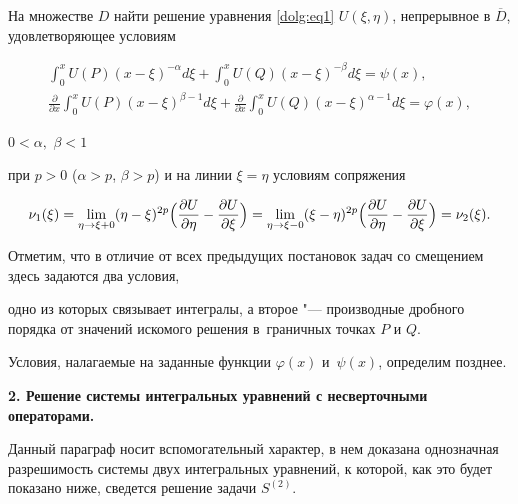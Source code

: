  На множестве $D$ найти решение уравнения \eqref{dolg:eq1} $U(\xi,\eta)$, непрерывное в $\overline{D}$, удовлетворяющее условиям

\begin{gather}\label{dolg:eq2}

\int _0^x U(P) (x-\xi)^{-\alpha} d\xi +  \int _0^x U(Q) (x-\xi)^{-\beta} d\xi = \psi(x),

\\



\label{dolg:eq3}

\frac{\partial}{\partial x}\int _0^x U(P) (x-\xi)^{\beta-1} d\xi +  \frac{\partial}{\partial x}\int _0^x U(Q) (x-\xi)^{\alpha-1} d\xi = \varphi(x),

\end{gather}

$0<\alpha,$ $\beta <1$ 

при $p>0$ ($\alpha>p$, $\beta>p$) и на линии $\xi=\eta$ условиям сопряжения

\begin{equation}\label{dolg:eq4}

\nu_1(\xi) = \lim_{\eta\to \xi+0} (\eta-\xi)^{2p} \Bigl(\frac{\partial U}{\partial \eta} - \frac{\partial U}{\partial \xi}\Bigr) = \lim_{\eta\to \xi-0} (\xi-\eta)^{2p} \Bigl(\frac{\partial U}{\partial \eta} - \frac{\partial U}{\partial \xi}\Bigr) = \nu_2(\xi).

\end{equation}



Отметим, что в отличие от всех предыдущих постановок задач со смещением здесь задаются два условия, 

одно из которых связывает интегралы, а второе "--- производные дробного порядка от значений искомого решения в~граничных точках $P$ и $Q$. 

Условия, налагаемые на заданные функции $\varphi(x)$ и~$\psi(x)$, определим позднее.



\smallskip



\textbf{2. Решение системы интегральных уравнений с несверточными операторами.}

Данный параграф носит вспомогательный характер, в нем доказана однозначная разрешимость системы двух интегральных уравнений, к которой, как это будет показано ниже, сведется решение задачи $S^{(2)}$.



